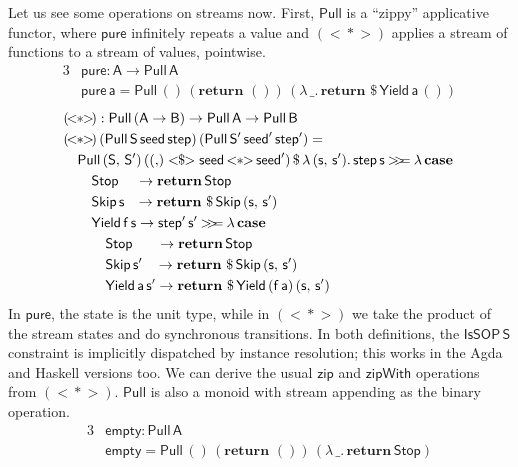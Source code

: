 \documentclass[acmsmall,screen,review,anonymous]{acmart}
\newcommand{\mit}[1]{{\mathsf{#1}}}
\newcommand{\msf}[1]{{\mathsf{#1}}}
\newcommand{\mbf}[1]{{\mathbf{#1}}}
\newcommand{\ind}{\hspace{1em}}
\newcommand{\return}{\mbf{return}\,}
\newcommand{\lam}{\lambda\,}
\newcommand{\vA}{\mathsf{A}}
\newcommand{\vB}{\mathsf{B}}
\newcommand{\vS}{\mathsf{S}}
\newcommand{\va}{\mathsf{a}}
\newcommand{\vf}{\mathsf{f}}
\newcommand{\vs}{\mathsf{s}}
\newcommand{\IsSOP}{\msf{IsSOP}}
\newcommand{\case}{\mbf{case\,}}
\newcommand{\bind}{\mathbin{>\!\!>\mkern-6.7mu=}}
\theoremstyle{remark}
\newcommand{\fmap}{<\!\!\$\!\!>}
\newcommand{\ap}{{<\!\!*\!\!>}}
\newcommand{\Stop}{\msf{Stop}}
\newcommand{\Skip}{\msf{Skip}}
\newcommand{\Yield}{\msf{Yield}}
\newcommand{\dlr}{\,\$\,}
\newcommand{\seed}{\mit{seed}}
\newcommand{\step}{\mit{step}}
\newcommand{\Pull}{\msf{Pull}}
\begin{document}
Let us see some operations on streams now. First, $\Pull$ is a ``zippy''
applicative functor, where $\mit{pure}$ infinitely repeats a value and $({\ap})$
applies a stream of functions to a stream of values, pointwise.
\begin{alignat*}{3}
  &\mit{pure} : \vA \to \Pull\,\vA\\
  &\mit{pure}\,\va = \Pull\,()\,(\return\,())\,(\lam \_.\,\return \dlr \Yield\,\va\,())
\end{alignat*}
\begin{alignat*}{3}
  &(\!\ap\!) : \Pull\,(\vA \to \vB) \to \Pull\,\vA \to \Pull\,\vB \\
  &(\!\ap\!)\,(\Pull\,\vS\,\seed\,\step)\,(\Pull\,\vS'\,\seed'\,\step') =\\
  & \ind \Pull\,(\vS,\,\vS')\,(({,}) \fmap \seed\,\ap\,\seed') \dlr \lam (\vs,\,\vs').\,\step\,\vs \bind \lam \case \\
  & \ind \ind \Stop \hspace{1.20em}        \to \return \Stop \\
  & \ind \ind \Skip\,\vs \hspace{0.75em}     \to \return \dlr \Skip\,(\vs,\,\vs') \\
  & \ind \ind \Yield\,\vf\,\vs \to \step'\,\vs' \bind \lam \case \\
  & \ind \ind \ind \Stop \hspace{1.7em} \to \return \Stop \\
  & \ind \ind \ind \Skip\,\vs'\hspace{0.9em}\to \return \dlr \Skip\,(\vs,\,\vs') \\
  & \ind \ind \ind \Yield\,\va\,\vs' \to \return \dlr \Yield\,(\vf\,\va)\,(\vs,\,\vs')
\end{alignat*}
In $\mit{pure}$, the state is the unit type, while in $(\!\ap\!)$ we take the
product of the stream states and do synchronous transitions. In both
definitions, the $\IsSOP\,\vS$ constraint is implicitly dispatched by instance
resolution; this works in the Agda and Haskell versions too. We can derive the
usual $\mit{zip}$ and $\mit{zipWith}$ operations from $(\!\ap\!)$. $\Pull$
is also a monoid with stream appending as the binary operation.
\begin{alignat*}{3}
  & \mit{empty} : \Pull\,\vA\\
  & \mit{empty} = \Pull\,()\,(\return\,())\,(\lam \_.\,\return \Stop)
\end{alignat*}
\end{document}
